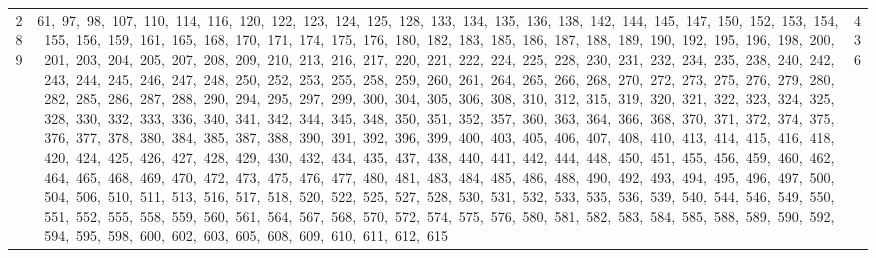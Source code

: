 \begin{longtable}{c|p{}|r}
289 & 61,\ 97,\ 98,\ 107,\ 110,\ 114,\ 116,\ 120,\ 122,\ 123,\ 124,\ 125,\ 128,\ 133,\ 134,\ 135,\ 136,\ 138,\ 142,\ 144,\ 145,\ 147,\ 150,\ 152,\ 153,\ 154,\ 155,\ 156,\ 159,\ 161,\ 165,\ 168,\ 170,\ 171,\ 174,\ 175,\ 176,\ 180,\ 182,\ 183,\ 185,\ 186,\ 187,\ 188,\ 189,\ 190,\ 192,\ 195,\ 196,\ 198,\ 200,\ 201,\ 203,\ 204,\ 205,\ 207,\ 208,\ 209,\ 210,\ 213,\ 216,\ 217,\ 220,\ 221,\ 222,\ 224,\ 225,\ 228,\ 230,\ 231,\ 232,\ 234,\ 235,\ 238,\ 240,\ 242,\ 243,\ 244,\ 245,\ 246,\ 247,\ 248,\ 250,\ 252,\ 253,\ 255,\ 258,\ 259,\ 260,\ 261,\ 264,\ 265,\ 266,\ 268,\ 270,\ 272,\ 273,\ 275,\ 276,\ 279,\ 280,\ 282,\ 285,\ 286,\ 287,\ 288,\ 290,\ 294,\ 295,\ 297,\ 299,\ 300,\ 304,\ 305,\ 306,\ 308,\ 310,\ 312,\ 315,\ 319,\ 320,\ 321,\ 322,\ 323,\ 324,\ 325,\ 328,\ 330,\ 332,\ 333,\ 336,\ 340,\ 341,\ 342,\ 344,\ 345,\ 348,\ 350,\ 351,\ 352,\ 357,\ 360,\ 363,\ 364,\ 366,\ 368,\ 370,\ 371,\ 372,\ 374,\ 375,\ 376,\ 377,\ 378,\ 380,\ 384,\ 385,\ 387,\ 388,\ 390,\ 391,\ 392,\ 396,\ 399,\ 400,\ 403,\ 405,\ 406,\ 407,\ 408,\ 410,\ 413,\ 414,\ 415,\ 416,\ 418,\ 420,\ 424,\ 425,\ 426,\ 427,\ 428,\ 429,\ 430,\ 432,\ 434,\ 435,\ 437,\ 438,\ 440,\ 441,\ 442,\ 444,\ 448,\ 450,\ 451,\ 455,\ 456,\ 459,\ 460,\ 462,\ 464,\ 465,\ 468,\ 469,\ 470,\ 472,\ 473,\ 475,\ 476,\ 477,\ 480,\ 481,\ 483,\ 484,\ 485,\ 486,\ 488,\ 490,\ 492,\ 493,\ 494,\ 495,\ 496,\ 497,\ 500,\ 504,\ 506,\ 510,\ 511,\ 513,\ 516,\ 517,\ 518,\ 520,\ 522,\ 525,\ 527,\ 528,\ 530,\ 531,\ 532,\ 533,\ 535,\ 536,\ 539,\ 540,\ 544,\ 546,\ 549,\ 550,\ 551,\ 552,\ 555,\ 558,\ 559,\ 560,\ 561,\ 564,\ 567,\ 568,\ 570,\ 572,\ 574,\ 575,\ 576,\ 580,\ 581,\ 582,\ 583,\ 584,\ 585,\ 588,\ 589,\ 590,\ 592,\ 594,\ 595,\ 598,\ 600,\ 602,\ 603,\ 605,\ 608,\ 609,\ 610,\ 611,\ 612,\ 615 & 436 \\

\end{longtable}
